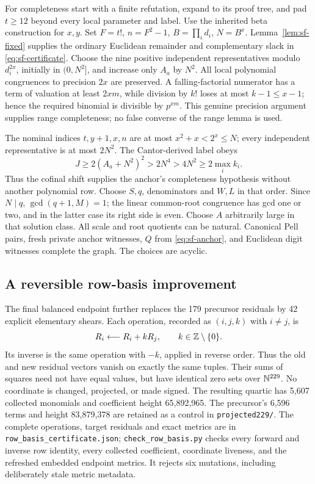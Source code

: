 For completeness start with a finite refutation, expand to its proof tree,
and pad \(t\ge12\) beyond every local parameter and label. Use the
inherited beta construction for \(x,y\). Set
\(F=t!\), \(n=F^2-1\), \(B=\prod_i d_i\), \(N=B^x\).
Lemma~\ref{lem:sf-fixed} supplies the ordinary Euclidean remainder
and complementary slack in \eqref{eq:sf-certificate}.
Choose the nine positive independent representatives modulo
\(d_i^{2x}\), initially in \((0,N^2]\), and increase only \(A_a\)
by \(N^2\). All local polynomial congruences to precision \(2x\)
are preserved. A falling-factorial numerator has a term of valuation
at least \(2xm\), while division by \(k!\) loses at most
\(k-1\le x-1\); hence the required binomial is divisible by
\(p^{xm}\). This genuine precision argument supplies range
completeness; no false converse of the range lemma is used.

The nominal indices \(t,y+1,x,n\) are at most
\(x^2+x<2^x\le N\); every independent representative is at most
\(2N^2\). The Cantor-derived label obeys
\[
 J\ge2(A_a+N^2)^2>2N^4>4N^2\ge2\max_i k_i.
\]
Thus the cofinal shift supplies the anchor's completeness hypothesis
without another polynomial row. Choose \(S,q\), denominators and
\(W,L\) in that order. Since \(N\mid q\),
\(\gcd(q+1,M)=1\); the linear common-root congruence has gcd one or
two, and in the latter case its right side is even. Choose \(A\)
arbitrarily large in that solution class. All scale and root quotients
can be natural. Canonical Pell pairs, fresh private anchor witnesses,
\(Q\) from \eqref{eq:sf-anchor}, and Euclidean digit witnesses
complete the graph. The choices are acyclic.

\subsection{A reversible row-basis improvement}
The final balanced endpoint further replaces the 179 precursor residuals
by 42 explicit elementary shears. Each operation, recorded as
\((i,j,k)\) with \(i\ne j\), is
\[
 R_i\longleftarrow R_i+kR_j,\qquad k\in\mathbb Z\setminus\{0\}.
\]
Its inverse is the same operation with \(-k\), applied in reverse order.
Thus the old and new residual vectors vanish on exactly the same tuples.
Their sums of squares need not have equal values, but have identical zero
sets over \(\mathbb N^{229}\). No coordinate is changed, projected, or made signed.
The resulting quartic has 5,607 collected monomials and coefficient height
65,892,965. The precursor's 6,596 terms and height 83,879,378 are retained
as a control in \texttt{projected229/}.
The complete operations, target residuals and exact metrics are in
\texttt{row\_basis\_certificate.json}; \texttt{check\_row\_basis.py}
checks every forward and inverse row identity, every collected coefficient,
coordinate liveness, and the refreshed embedded endpoint metrics. It rejects
six mutations, including deliberately stale metric metadata.

